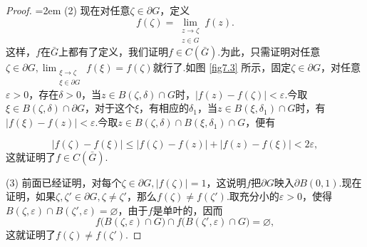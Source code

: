 \begin{proof}
  \noindent\begin{minipage}{0.7\textwidth}\parindent=2em
    (2) \hypertarget{thm7.3.1.2}{}  现在对任意$\zeta\in\partial G$，定义
    \[
      f(\zeta) = \lim_{\substack{z\to\zeta\\z\in G}}f(z).
    \]
    这样，$f$在$\bar G$上都有了定义，我们证明$f\in C(\bar G)$.为此，只需证明对任意$\zeta\in\partial G,\lim_{\substack{\xi\to\zeta\\\xi\in \partial G}}f(\xi)=f(\zeta)$就行了.如图
    \ref{fig7.3} 所示，固定$\zeta\in\partial G$，对任意$\varepsilon>0$，存在$\delta>0$，当$z\in B(\zeta,\delta)\cap G$时，$|f(z)-f(\zeta)|<\varepsilon$.今取$\xi\in B(\zeta,\delta)\cap\partial G$，对于这个$\xi$，有相应的$\delta_1$，当$z\in B(\xi,\delta_1)\cap G$时，有$|f(\xi)-f(z)|<\varepsilon$.今取$z\in B(\zeta,\delta)\cap B(\xi,\delta_1)\cap G$，便有
  \end{minipage}
  \begin{minipage}{0.3\textwidth}
    \centering
  \end{minipage}
  \[
    |f(\zeta)-f(\xi)| \le |f(\zeta)-f(z)| + |f(z)-f(\xi)| < 2\varepsilon,
  \]
  这就证明了$f\in C(\bar G)$.

  (3) \hypertarget{thm7.3.1.3}{} 前面已经证明，对每个$\zeta\in\partial G,|f(\zeta)|=1$，这说明$f$把$\partial G$映入$\partial B(0,1)$.现在证明，如果$\zeta,\zeta'\in\partial G,\zeta\ne\zeta'$，那么$f(\zeta)\ne f(\zeta')$.取充分小的$\varepsilon>0$，使得$B(\zeta,\varepsilon)\cap B(\zeta',\varepsilon)=\varnothing$，由于$f$是单叶的，因而
  \[
    f\big(B(\zeta,\varepsilon)\cap G\big)\cap f\big(B(\zeta',\varepsilon)\cap G\big)=
    \varnothing,
  \]
  这就证明了$f(\zeta)\ne f(\zeta')$.


\end{proof}
